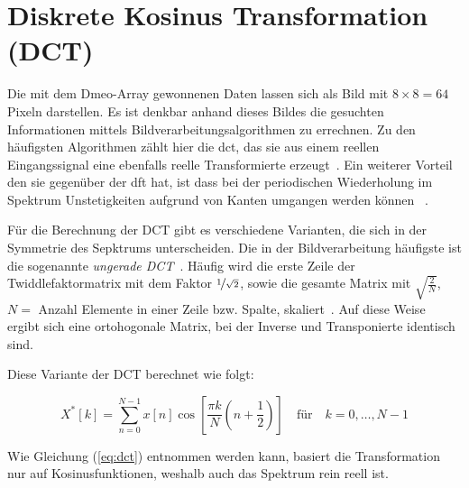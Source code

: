 \section{Diskrete Kosinus Transformation (DCT)}
Die mit dem Dmeo-Array gewonnenen Daten lassen sich als Bild mit $8\times8=64$ Pixeln darstellen. Es ist denkbar anhand dieses Bildes die gesuchten
Informationen mittels Bildverarbeitungsalgorithmen zu errechnen.
Zu den häufigsten Algorithmen zählt hier die \gls{dct}, das sie aus einem reellen Eingangssignal eine ebenfalls reelle Transformierte erzeugt~\autocite[355-359]{burger2006digBildverarbeitung}. 
Ein weiterer Vorteil den sie gegenüber der \gls{dft} hat, ist dass bei der periodischen Wiederholung im Spektrum Unstetigkeiten aufgrund von Kanten umgangen werden können
~\autocite[28-31]{psturm1999bildkompression}.

Für die Berechnung der DCT gibt es verschiedene Varianten, die sich in der Symmetrie des Sepktrums unterscheiden. Die in der Bildverarbeitung häufigste ist 
die sogenannte \textit{ungerade DCT}~\autocite[28-31]{psturm1999bildkompression}.
Häufig wird die erste Zeile der Twiddlefaktormatrix mit dem Faktor $\nicefrac{1}{\sqrt2}$, sowie die gesamte Matrix mit 
$\sqrt{\frac{2}{N}}$, $N =$ Anzahl Elemente in einer Zeile bzw. Spalte, skaliert~\autocite{wikiDCT}. Auf diese Weise ergibt sich eine ortohogonale Matrix, bei der Inverse und
 Transponierte identisch sind.  

Diese Variante der DCT berechnet wie folgt:

\begin{equation}\label{eq:dct}
X^*[k] = \sum_{n=0}^{N-1} x[n] \cos\left[\frac{\pi k}{N} \left(n+\frac{1}{2}\right) \right] \quad \textrm{für} \quad  k=0,\dots,N-1
\end{equation}

Wie Gleichung (\ref{eq:dct}) entnommen werden kann, basiert die Transformation nur auf Kosinusfunktionen, weshalb auch das Spektrum rein reell ist.
% 
